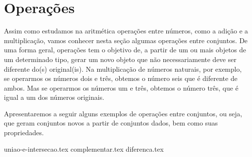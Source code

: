 \section{Operações}
\label{sec:op}
Assim como estudamos na aritmética operações entre números, como a adição e a multiplicação, vamos conhecer nesta seção algumas operações entre conjuntos. De uma forma geral, operações tem o objetivo de, a partir de um ou mais objetos de um determinado tipo, gerar um novo objeto que não necessariamente deve ser diferente do(s) original(is). Na multiplicação de números naturais, por exemplo, se operarmos os números dois e três, obtemos o número seis que é diferente de ambos. Mas se operarmos os números um e três, obtemos o número três, que é igual a um dos números originais.

Apresentaremos a seguir alguns exemplos de operações entre conjuntos, ou seja, que geram conjuntos novos a partir de conjuntos dados, bem como suas propriedades.

{uniao-e-intersecao.tex}
{complementar.tex}
{diferenca.tex}


